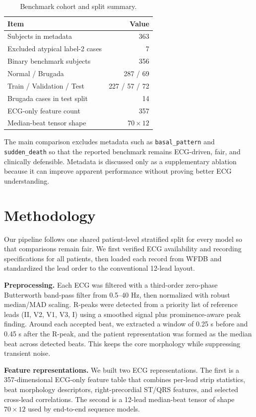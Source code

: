 \documentclass[10pt,twocolumn]{article}
\let\originaltexttt\texttt
\renewcommand{\texttt}[1]{%
  \begingroup
  \setlength{\fboxsep}{1.2pt}%
  \colorbox{inlinecodebg}{\originaltexttt{#1}}%
  \endgroup
}
\begin{document}
\begin{table}[!t]
\centering
\caption{Benchmark cohort and split summary.}
\label{tab:dataset}
\small
\begin{tabular}{lr}
\toprule
Item & Value \\
\midrule
Subjects in metadata & 363 \\
Excluded atypical label-2 cases & 7 \\
Binary benchmark subjects & 356 \\
Normal / Brugada & 287 / 69 \\
Train / Validation / Test & 227 / 57 / 72 \\
Brugada cases in test split & 14 \\
ECG-only feature count & 357 \\
Median-beat tensor shape & $70 \times 12$ \\
\bottomrule
\end{tabular}
\end{table}

The main comparison excludes metadata such as \texttt{basal\_pattern} and \texttt{sudden\_death} so that the reported benchmark remains ECG-driven, fair, and clinically defensible. Metadata is discussed only as a supplementary ablation because it can improve apparent performance without proving better ECG understanding.

\section{Methodology}
Our pipeline follows one shared patient-level stratified split for every model so that comparisons remain fair. We first verified ECG availability and recording specifications for all patients, then loaded each record from WFDB and standardized the lead order to the conventional 12-lead layout.

\textbf{Preprocessing.} Each ECG was filtered with a third-order zero-phase Butterworth band-pass filter from 0.5--40 Hz, then normalized with robust median/MAD scaling. R-peaks were detected from a priority list of reference leads (II, V2, V1, V3, I) using a smoothed signal plus prominence-aware peak finding. Around each accepted beat, we extracted a window of 0.25 s before and 0.45 s after the R-peak, and the patient representation was formed as the median beat across detected beats. This keeps the core morphology while suppressing transient noise.

\textbf{Feature representations.} We built two ECG representations. The first is a 357-dimensional ECG-only feature table that combines per-lead strip statistics, beat morphology descriptors, right-precordial ST/QRS features, and selected cross-lead correlations. The second is a 12-lead median-beat tensor of shape $70 \times 12$ used by end-to-end sequence models.
\end{document}
